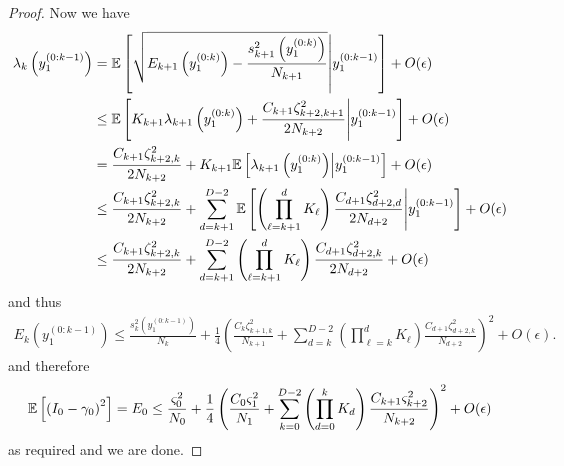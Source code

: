 \begin{proof}
 Now we have
 \begin{align*}
  \lambda_k \left(y_1^{(0:k-1)}\right)  &=
  \mathbb{E} \left[\sqrt{E_{k+1} 
  \left(y_1^{(0:k)}\right) -\frac{s_{k+1}^2 \left(y_1^{(0:k)}\right)}{N_{k+1}}}
  \middle|  y_1^{(0:k-1)}  \right] +O(\epsilon)\\
 &\le \mathbb{E} \left[K_{k+1} \lambda_{k+1} \left(y_1^{(0:k)}\right) 
  +\frac{C_{k+1} \zeta_{k+2,k+1}^2}{2 N_{k+2}} \middle|  y_1^{(0:k-1)} \right] 
  +O(\epsilon)\\
 &= \frac{C_{k+1} \zeta_{k+2,k}^2}{2 N_{k+2}}
 +K_{k+1} \mathbb{E} \left[\lambda_{k+1} \left(y_1^{(0:k)}\right)  \middle|  y_1^{(0:k-1)} \right] +O(\epsilon)\\
  &\le \frac{C_{k+1} \zeta_{k+2,k}^2}{2 N_{k+2}}+
  \sum_{d=k+1}^{D-2}  \mathbb{E} \left[\left(\prod_{\ell=k+1}^{d} K_{\ell}\right)
  \frac{C_{d+1} \zeta^2_{d+2,d}}{2 N_{d+2}} \middle|  y_1^{(0:k-1)} \right] +O(\epsilon) \\
 &\le \frac{C_{k+1} \zeta_{k+2,k}^2}{2 N_{k+2}}+
 \sum_{d=k+1}^{D-2}  \left(\prod_{\ell=k+1}^{d} K_{\ell}\right)
 \frac{C_{d+1} \zeta^2_{d+2,k}}{2 N_{d+2}}+O(\epsilon)
 \end{align*}
 and thus
 \begin{align*}
 E_k \left(y_1^{(0:k-1)}\right)  \le \frac{s_k^2 \left(y_1^{(0:k-1)}\right)}{N_k}
 +\frac{1}{4}\left(
 \frac{C_k \zeta_{k+1,k}^2}{N_{k+1}}
 +\sum_{d=k}^{D-2}  \left(\prod_{\ell=k}^{d} K_{\ell}\right)
  \frac{C_{d+1} \zeta^2_{d+2,k}}{N_{d+2}}
 \right)^2 + O(\epsilon).
 \end{align*}
 and therefore
  \begin{align*}
  \mathbb{E} \left[\left(I_0-\gamma_0\right)^2\right] 
  = E_0  \le \frac{\varsigma_0^2}{N_0}
  +\frac{1}{4}\left(
  \frac{C_0 \varsigma_{1}^2}{N_{1}}
  +\sum_{k=0}^{D-2}  \left(\prod_{d=0}^{k} K_{d}\right)
  \frac{C_{k+1} \varsigma^2_{k+2}}{N_{k+2}}
  \right)^2 + O(\epsilon)
  \end{align*}
  as required and we are done.
\end{proof}